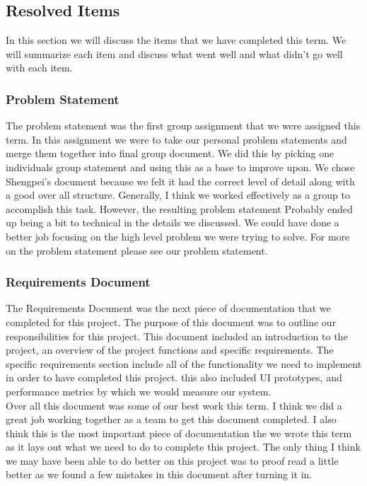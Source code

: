 \documentclass[onecolumn, draftclsnofoot,10pt, compsoc]{article}
\begin{document}
	\subsection{Resolved Items}
	    In this section we will discuss the items that we have completed this term. We will summarize each item and discuss what went well and what didn't go well with each item.\\
	    
	    \subsubsection{Problem Statement}
	       The problem statement was the first group assignment that we were assigned this term. In this assignment we were to take our personal problem statements and merge them together into final group document. We did this by picking one individuals group statement and using this as a base to improve upon. We chose Shengpei's document because we felt it had the correct level of detail along with a good over all structure. Generally, I think we worked effectively as a group to accomplish this task. However, the resulting problem statement Probably ended up being a bit to technical in the details we discussed. We could have done a better job focusing on the high level problem we were trying to solve. For more on the problem statement please see our problem statement.\\
	        
	    \subsubsection{Requirements Document}
	        The Requirements Document was the next piece of documentation that we completed for this project. The purpose of this document was to outline our responsibilities for this project. This document included an introduction to the project, an overview of the project functions and specific requirements. The specific requirements section include all of the functionality we need to implement in order to have completed this project. this also included UI prototypes, and performance metrics by which we would measure our system.\\
	        
	        Over all this document was some of our best work this term. I think we did a great job working together as a team to get this document completed. I also think this is the most important piece of documentation the we wrote this term as it lays out what we need to do to complete this project. The only thing I think we may have been able to do better on this project was to proof read a little better as we found a few mistakes in this document after turning it in.\\
	    
\end{document}
